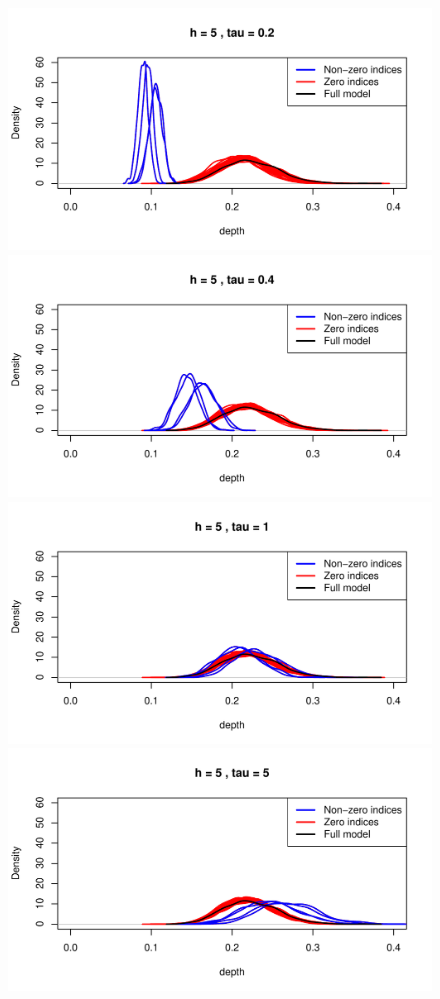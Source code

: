 \begin{figure}
\centering
\includegraphics[height=.22\textheight]{Chapter-appli/plot_h5_tau2}\\
\includegraphics[height=.22\textheight]{Chapter-appli/plot_h5_tau4}\\
\includegraphics[height=.22\textheight]{Chapter-appli/plot_h5_tau10}\\
\includegraphics[height=.22\textheight]{Chapter-appli/plot_h5_tau50}

\end{figure}
